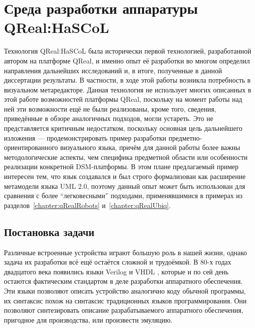 \section{Среда разработки аппаратуры QReal:HaSCoL}
Технология QReal:HaSCoL была исторически первой технологией, разработанной автором 
на платформе QReal, и именно опыт её разработки во многом определил направления дальнейших 
исследований и, в итоге, полученные в данной диссертации результаты. В частности, 
в ходе этой работы возникла потребность в визуальном метаредакторе. Данная технология 
не использует многих описанных в этой работе возможностей платформы QReal, поскольку 
на момент работы над ней эти возможности ещё не были реализованы, кроме того, сведения, 
приведённые в обзоре аналогичных подходов, могли устареть. Это не представляется критичным 
недостатком, поскольку основная цель дальнейшего изложения --- продемонстрировать 
пример разработки предметно-ориентированного визуального языка, причём для данной 
работы более важны методологические аспекты, чем специфика предметной области или особенности реализации конкретной DSM-платформы. 
В этом плане предлагаемый пример интересен тем, что язык создавался и был строго формализован как расширение метамодели 
языка UML 2.0, поэтому данный опыт может быть использован для сравнения с более "`легковесными"' 
подходами, применявшимися в примерах из разделов~\ref{chapter:qRealRobots} и~\ref{chapter:qRealUbiq}.

\subsection{Постановка задачи}
Различные встроенные устройства играют большую роль в нашей жизни, однако задача их 
разработки всё ещё остаётся сложной и трудоёмкой. В 80-х годах двадцатого века появились языки Verilog и VHDL%
, которые и по сей день остаются фактическим стандартом в деле разработки аппаратного 
обеспечения. Эти языки позволяют описать устройство аналогично коду обычной программы, 
их синтаксис похож на синтаксис традиционных языков программирования. Они позволяют 
синтезировать описание разрабатываемого аппаратного обеспечения, пригодное для производства, 
или произвести эмуляцию.

